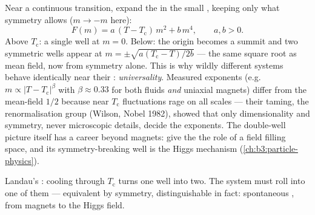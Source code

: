 \begin{proposition}\label{prop:b3:phase-transitions:landau}
Near a continuous transition, expand the  in the small
, keeping only what symmetry allows ($m \to -m$
here):
\[
F(m) = a\,(T - T_{\text{c}})\,m^2 + b\,m^4 , \qquad a, b > 0 .
\]
Above $T_{\text{c}}$: a single well at $m = 0$. Below: the origin
becomes a summit and two symmetric wells appear at $m = \pm
\sqrt{a(T_{\text{c}} - T)/2b}$ --- the same square root as mean
field, now from symmetry alone. This is why wildly different
systems behave identically near their :
\emph{universality}. Measured exponents (e.g.\ $m \propto |T -
T_{\text{c}}|^\beta$ with $\beta \approx 0.33$ for both fluids
\emph{and} uniaxial magnets) differ from the mean-field $1/2$
because near $T_{\text{c}}$ fluctuations rage on all scales ---
their taming, the renormalisation group (Wilson, Nobel 1982),
showed that only dimensionality and symmetry, never microscopic
details, decide the exponents. The double-well picture itself has
a career beyond magnets: give the  the role of a
field filling space, and its symmetry-breaking well is the Higgs
mechanism (\cref{ch:b3:particle-physics}).
\end{proposition}
\admitted

\begin{omfigure}

{\small Landau's : cooling through $T_{\text{c}}$ turns
one well into two. The system must roll into one of them ---
equivalent by symmetry, distinguishable in fact: spontaneous
, from magnets to the Higgs field.}
\end{omfigure}

